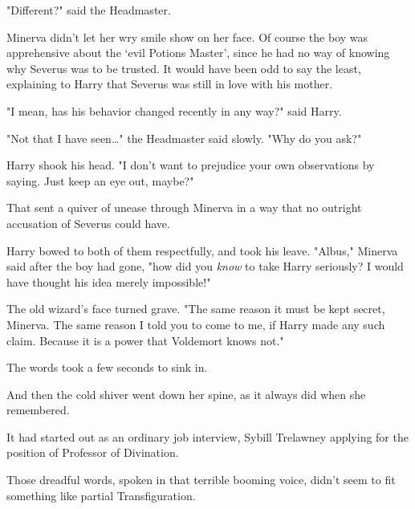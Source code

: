 "Different?" said the Headmaster.

Minerva didn't let her wry smile show on her face. Of course the boy was
apprehensive about the `evil Potions Master', since he had no way of knowing
why Severus was to be trusted. It would have been odd to say the least,
explaining to Harry that Severus was still in love with his mother.

"I mean, has his behavior changed recently in any way?" said Harry.

"Not that I have seen{\ldots}" the Headmaster said slowly. "Why do you ask?"

Harry shook his head. "I don't want to prejudice your own observations by
saying. Just keep an eye out, maybe?"

That sent a quiver of unease through Minerva in a way that no outright
accusation of Severus could have.

Harry bowed to both of them respectfully, and took his leave.
\later
"Albus," Minerva said after the boy had gone, "how did you \emph{know} to take
Harry seriously? I would have thought his idea merely impossible!"

The old wizard's face turned grave. "The same reason it must be kept secret,
Minerva. The same reason I told you to come to me, if Harry made any such
claim. Because it is a power that Voldemort knows not."

The words took a few seconds to sink in.

And then the cold shiver went down her spine, as it always did when she
remembered.

It had started out as an ordinary job interview, Sybill Trelawney applying for
the position of Professor of Divination.


Those dreadful words, spoken in that terrible booming voice, didn't seem to fit
something like partial Transfiguration.

